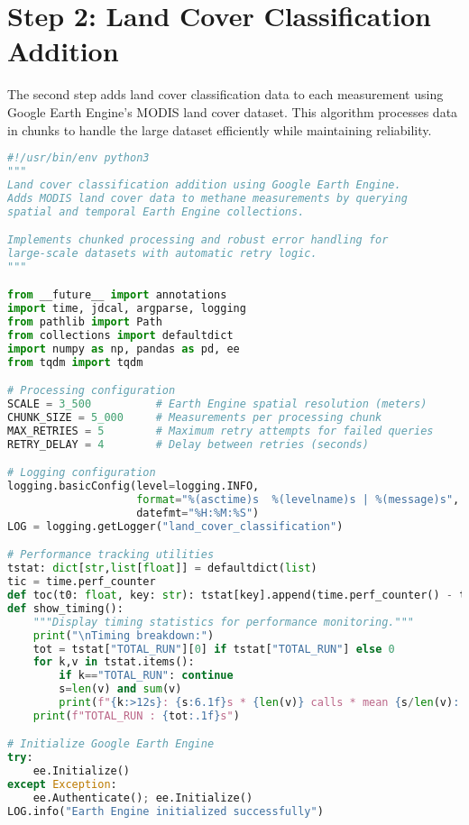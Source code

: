\section{Step 2: Land Cover Classification Addition}
\label{sec:appendixB_step2}

The second step adds land cover classification data to each measurement using Google Earth Engine's MODIS land cover dataset. This algorithm processes data in chunks to handle the large dataset efficiently while maintaining reliability.

\begin{lstlisting}[language=Python, caption=Land Cover Classification Addition Algorithm, label=alg:step02_add_lc, breaklines=true]
#!/usr/bin/env python3
"""
Land cover classification addition using Google Earth Engine.
Adds MODIS land cover data to methane measurements by querying
spatial and temporal Earth Engine collections.

Implements chunked processing and robust error handling for 
large-scale datasets with automatic retry logic.
"""

from __future__ import annotations
import time, jdcal, argparse, logging
from pathlib import Path
from collections import defaultdict
import numpy as np, pandas as pd, ee
from tqdm import tqdm

# Processing configuration
SCALE = 3_500          # Earth Engine spatial resolution (meters)
CHUNK_SIZE = 5_000     # Measurements per processing chunk
MAX_RETRIES = 5        # Maximum retry attempts for failed queries
RETRY_DELAY = 4        # Delay between retries (seconds)

# Logging configuration
logging.basicConfig(level=logging.INFO,
                    format="%(asctime)s  %(levelname)s | %(message)s",
                    datefmt="%H:%M:%S")
LOG = logging.getLogger("land_cover_classification")

# Performance tracking utilities
tstat: dict[str,list[float]] = defaultdict(list)
tic = time.perf_counter
def toc(t0: float, key: str): tstat[key].append(time.perf_counter() - t0)
def show_timing():
    """Display timing statistics for performance monitoring."""
    print("\nTiming breakdown:")
    tot = tstat["TOTAL_RUN"][0] if tstat["TOTAL_RUN"] else 0
    for k,v in tstat.items():
        if k=="TOTAL_RUN": continue
        s=len(v) and sum(v)
        print(f"{k:>12s}: {s:6.1f}s * {len(v)} calls * mean {s/len(v):.3f}s")
    print(f"TOTAL_RUN : {tot:.1f}s")

# Initialize Google Earth Engine
try: 
    ee.Initialize()
except Exception:
    ee.Authenticate(); ee.Initialize()
LOG.info("Earth Engine initialized successfully")


\end{lstlisting}
